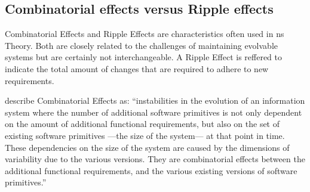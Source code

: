 \subsection{Combinatorial effects versus Ripple effects} \label{subsec_ripple_effect}

Combinatorial Effects and Ripple Effects are characteristics often used in \gls{ns}
Theory. Both are closely related to the challenges of maintaining evolvable systems but
are certainly not interchangeable. A Ripple Effect is reffered to indicate the total amount
of changes that are required to adhere to new requirements. 

\textcite[271-272]{mannaert_normalized_2016} describe Combinatorial Effects as:
\enquote{instabilities in the evolution of an information system where the number of
additional software primitives is not only dependent on the amount of additional
functional requirements, but also on the set of existing software primitives —the size of
the system— at that point in time. These dependencies on the size of the system are caused
by the dimensions of variability due to the various versions. They are combinatorial
effects between the additional functional requirements, and the various existing versions
of software primitives.}